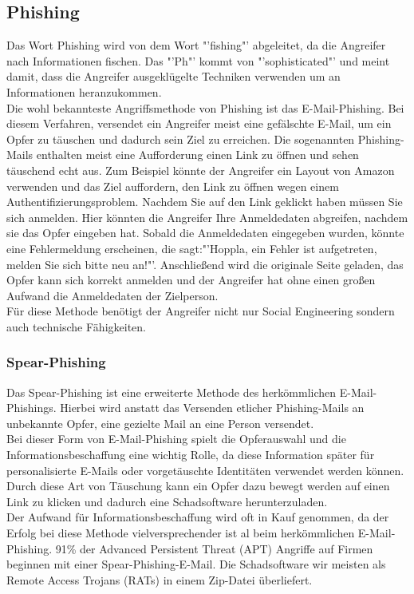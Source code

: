 		\subsection{Phishing}
		Das Wort Phishing wird von dem Wort "'fishing"' abgeleitet, da die Angreifer nach Informationen fischen. Das "'Ph"' kommt von "'sophisticated"' und meint damit, dass die Angreifer ausgeklügelte Techniken verwenden um an Informationen heranzukommen.\cite{PhishingExposed}\\
		Die wohl bekannteste Angriffsmethode von Phishing ist das E-Mail-Phishing. Bei diesem Verfahren, versendet ein Angreifer meist eine gefälschte E-Mail, um ein Opfer zu täuschen und dadurch sein Ziel zu erreichen. Die sogenannten Phishing-Mails enthalten meist eine Aufforderung einen Link zu öffnen und sehen täuschend echt aus. Zum Beispiel könnte der Angreifer ein Layout von Amazon verwenden und das Ziel auffordern, den Link zu öffnen wegen einem Authentifizierungsproblem. Nachdem Sie auf den Link geklickt haben müssen Sie sich anmelden. Hier könnten die Angreifer Ihre Anmeldedaten abgreifen, nachdem sie das Opfer eingeben hat. Sobald die Anmeldedaten eingegeben wurden, könnte eine Fehlermeldung erscheinen, die sagt:"'Hoppla, ein Fehler ist aufgetreten, melden Sie sich bitte neu an!"'. Anschließend wird die originale Seite geladen, das Opfer kann sich korrekt anmelden und der Angreifer hat ohne einen großen Aufwand die Anmeldedaten der Zielperson.\\
		Für diese Methode benötigt der Angreifer nicht nur Social Engineering  sondern auch technische Fähigkeiten.\cite{PhishingDarkWaters}
		
		\subsubsection{Spear-Phishing}
		Das Spear-Phishing ist eine erweiterte Methode des herkömmlichen E-Mail-Phishings. Hierbei wird anstatt das Versenden etlicher Phishing-Mails an unbekannte Opfer, eine gezielte Mail an eine Person versendet.\cite{SpearPhishingPaper}\\
		Bei dieser Form von E-Mail-Phishing spielt die Opferauswahl und die Informationsbeschaffung eine wichtig Rolle, da diese Information später für personalisierte E-Mails oder vorgetäuschte Identitäten verwendet werden können. Durch diese Art von Täuschung kann ein Opfer dazu bewegt werden auf einen Link zu klicken und dadurch eine Schadsoftware herunterzuladen.\cite{SpearPhishingPaper} \\
		Der Aufwand für Informationsbeschaffung wird oft in Kauf genommen, da der Erfolg bei diese Methode vielversprechender ist al beim herkömmlichen E-Mail-Phishing.
		91\% der Advanced Persistent Threat (APT) Angriffe auf Firmen beginnen mit einer Spear-Phishing-E-Mail. Die Schadsoftware wir meisten als Remote Access Trojans (RATs) in einem Zip-Datei überliefert.\cite{SpearPhishing}


